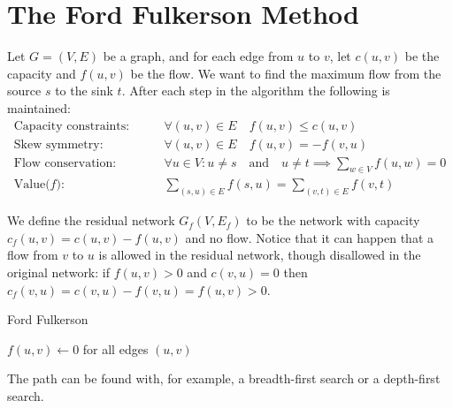 \documentclass[12pt]{article}
\begin{document}
\section*{The Ford Fulkerson Method}
Let $G = (V,E)$ be a graph, and for each edge from $u$ to $v$, let $c(u,v)$
be the capacity and $f(u,v)$ be the flow. We want to find the maximum
flow from the source $s$ to the sink $t$. After each step in the algorithm
the following is maintained:
\begin{align*}
  \text{Capacity constraints:}\qquad & \forall(u,v) \in E \quad f(u,v)
  \le c(u,v) \\
  \text{Skew symmetry:}\qquad & \forall(u,v) \in E \quad f(u,v) = -f(v,u) \\
  \text{Flow conservation:}\qquad & \forall u \in V : u \ne s
  \quad \text{and}\quad
  u \ne t \implies \sum_{w \in V} f(u,w) = 0 \\
  \text{Value($f$):}\qquad & \sum_{(s,u)\in E}f(s,u) = \sum_{(v,t)\in E}f(v,t)
\end{align*}

We define the residual network $G_f(V,E_f)$ to be the network with
capacity $c_f(u,v) = c(u,v) - f(u,v)$ and no flow. Notice that it can happen
that a flow from $v$ to $u$ is allowed in the residual network, though
disallowed in the original network: if $f(u,v) > 0$
and $c(v,u) = 0$ then $c_f(v,u) = c(v,u) - f(v,u) = f(u,v) > 0$.\\

\begin{algorithm}[H]
 \caption{Ford Fulkerson}
 $f(u,v) \gets 0$ for all edges $(u,v)$ \\
\end{algorithm}
\vspace{.5cm}
The path can be found with, for example, a breadth-first search or a depth-first search.

\end{document}
